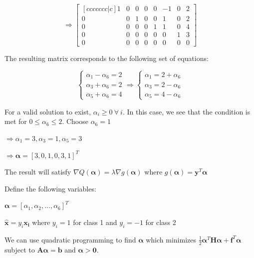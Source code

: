 \documentclass[fleqn]{article}
\begin{document}
\begin{enumerate}
\begin{enumerate}
		\begin{equation*}
			\Rightarrow \begin{bmatrix}[ccccccc|c]
				1 & 0 & 0 & 0 & 0 & -1 & 0 & 2 \\
     			0 & 0 & 1 & 0 & 0 &  1 & 0 & 2 \\
               	0 & 0 & 0 & 0 & 1 &  1 & 0 & 4 \\
     			0 & 0 & 0 & 0 & 0 &  0 & 1 & 3 \\
     			0 & 0 & 0 & 0 & 0 &  0 & 0 & 0
			\end{bmatrix}
		\end{equation*}
		
		The resulting matrix corresponds to the following set of equations:
		
		\begin{equation*}
			\begin{cases}
				\alpha_1 - \alpha_6 = 2 \\
				\alpha_3 + \alpha_6 = 2 \\
				\alpha_5 + \alpha_6 = 4
			\end{cases} \Rightarrow \begin{cases}
				\alpha_1 = 2 + \alpha_6 \\
				\alpha_3 = 2 - \alpha_6 \\
				\alpha_5 = 4 - \alpha_6
			\end{cases}
		\end{equation*}
		
		For a valid solution to exist, $\alpha_i \geq 0\ \forall\ i$. In this case, we see that the condition is met for $0 \leq \alpha_6 \leq 2$. Choose $\alpha_6 = 1$
		
		$\Rightarrow \alpha_1 = 3, \alpha_3 = 1, \alpha_5 = 3$
		
		$\Rightarrow\boldsymbol{\alpha} = [3,0,1,0,3,1]^T$
		
		
		
		The result will satisfy $\nabla Q(\boldsymbol{\alpha}) = \lambda\nabla g(\boldsymbol{\alpha})$ where $g(\mathbf{\alpha}) = \mathbf{y}^T\boldsymbol{\alpha}$
		
		
		Define the following variables:
		
		$\boldsymbol{\alpha} = [\alpha_1, \alpha_2, ..., \alpha_6]^T$
		
		$\mathbf{\hat{x}} = y_i\mathbf{x_i}$ where $y_i = 1$ for class 1 and $y_i = -1$ for class 2
		
		We can use quadratic programming to find $\boldsymbol{\alpha}$ which minimizes \newline $\frac{1}{2}\boldsymbol{\alpha}^T\mathbf{H}\boldsymbol{\alpha} + \mathbf{f}^T\boldsymbol{\alpha}$ subject to $\mathbf{A}\boldsymbol{\alpha} = \mathbf{b}$ and $\boldsymbol{\alpha} > \mathbf{0}$.
		

\end{enumerate}
\end{enumerate}
\end{document}
